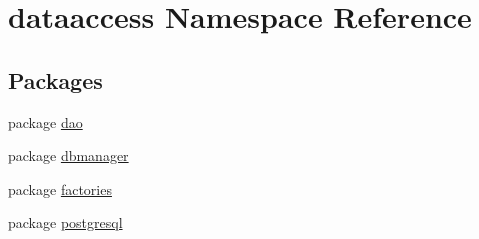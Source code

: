 \hypertarget{namespacedataaccess}{\section{dataaccess \-Namespace \-Reference}
\label{namespacedataaccess}
}
\subsection*{\-Packages}
\begin{DoxyCompactItemize}
\item 
package \hyperlink{namespacedataaccess_1_1dao}{dao}
\item 
package \hyperlink{namespacedataaccess_1_1dbmanager}{dbmanager}
\item 
package \hyperlink{namespacedataaccess_1_1factories}{factories}
\item 
package \hyperlink{namespacedataaccess_1_1postgresql}{postgresql}
\end{DoxyCompactItemize}
